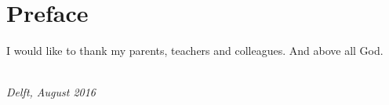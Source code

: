 \chapter*{Preface}

I would like to thank my parents, teachers and colleagues. And above all God.

\begin{flushright}
{\makeatletter\itshape
    \@author \\
    Delft, August 2016
\makeatother}
\end{flushright}


